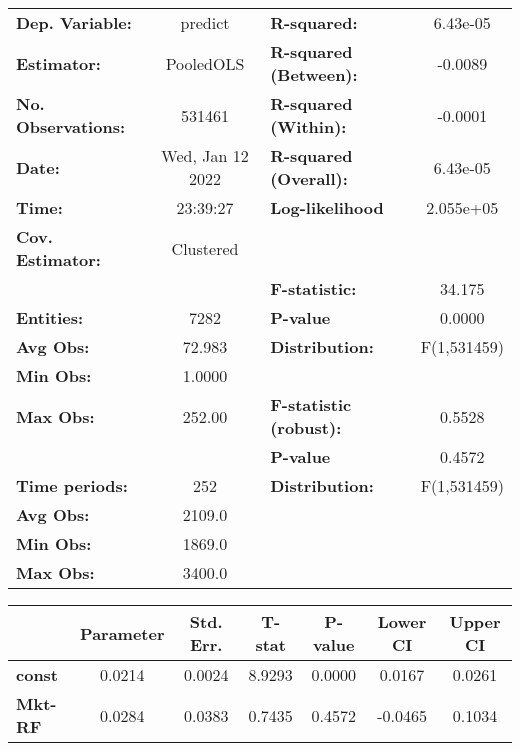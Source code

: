 \begin{center}
\begin{tabular}{lclc}
\toprule
\textbf{Dep. Variable:}    &      predict       & \textbf{  R-squared:         }   &     6.43e-05     \\
\textbf{Estimator:}        &     PooledOLS      & \textbf{  R-squared (Between):}  &     -0.0089      \\
\textbf{No. Observations:} &       531461       & \textbf{  R-squared (Within):}   &     -0.0001      \\
\textbf{Date:}             &  Wed, Jan 12 2022  & \textbf{  R-squared (Overall):}  &     6.43e-05     \\
\textbf{Time:}             &      23:39:27      & \textbf{  Log-likelihood     }   &    2.055e+05     \\
\textbf{Cov. Estimator:}   &     Clustered      & \textbf{                     }   &                  \\
\textbf{}                  &                    & \textbf{  F-statistic:       }   &      34.175      \\
\textbf{Entities:}         &        7282        & \textbf{  P-value            }   &      0.0000      \\
\textbf{Avg Obs:}          &       72.983       & \textbf{  Distribution:      }   &   F(1,531459)    \\
\textbf{Min Obs:}          &       1.0000       & \textbf{                     }   &                  \\
\textbf{Max Obs:}          &       252.00       & \textbf{  F-statistic (robust):} &      0.5528      \\
\textbf{}                  &                    & \textbf{  P-value            }   &      0.4572      \\
\textbf{Time periods:}     &        252         & \textbf{  Distribution:      }   &   F(1,531459)    \\
\textbf{Avg Obs:}          &       2109.0       & \textbf{                     }   &                  \\
\textbf{Min Obs:}          &       1869.0       & \textbf{                     }   &                  \\
\textbf{Max Obs:}          &       3400.0       & \textbf{                     }   &                  \\
\bottomrule
\end{tabular}
\begin{tabular}{lcccccc}
                & \textbf{Parameter} & \textbf{Std. Err.} & \textbf{T-stat} & \textbf{P-value} & \textbf{Lower CI} & \textbf{Upper CI}  \\
\midrule
\textbf{const}  &       0.0214       &       0.0024       &      8.9293     &      0.0000      &       0.0167      &       0.0261       \\
\textbf{Mkt-RF} &       0.0284       &       0.0383       &      0.7435     &      0.4572      &      -0.0465      &       0.1034       \\
\bottomrule
\end{tabular}
\end{center}
